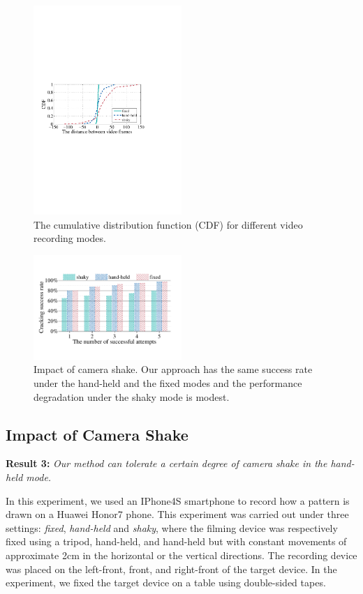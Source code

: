 \begin{figure}[t!]
    \centering
    \includegraphics[width=0.5\textwidth]{fig/13.pdf}
    \caption{The cumulative distribution function (CDF) for different video recording modes.}
    \label{fig:fig13}
\end{figure}

\begin{figure}[!t]
    \centering
    \includegraphics[width=0.5\textwidth]{fig/14.pdf}
    \caption{Impact of camera shake. Our approach has the same success rate under the hand-held and the fixed modes and the performance degradation under the shaky mode is modest. }
    \label{fig:fig14}
\end{figure}


    \subsection{Impact of Camera Shake}

    \noindent \textbf{Result 3:} \emph{Our method can tolerate a certain degree of camera shake in the hand-held mode.}

    In this experiment, we used an IPhone4S smartphone to record how a pattern is drawn on a Huawei Honor7 phone. This experiment was carried out under three settings:
    \emph{fixed}, \emph{hand-held} and \emph{shaky}, where the filming
    device was respectively fixed using a tripod, hand-held, and hand-held but with constant movements of
     approximate 2cm in the horizontal or the vertical directions. The recording device was placed on the left-front, front, and right-front of the target device.
    In the experiment, we fixed the target device on a table using double-sided tapes.

